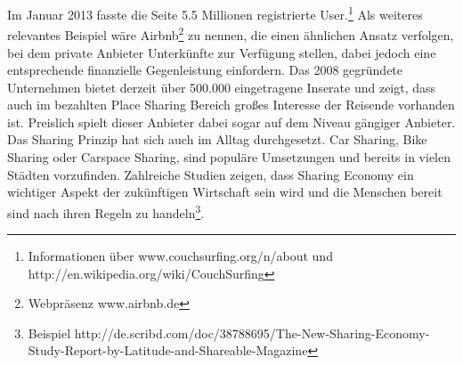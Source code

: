 Im Januar 2013 fasste die Seite 5.5 Millionen registrierte User.\footnote{Informationen über www.couchsurfing.org/n/about und http://en.wikipedia.org/wiki/CouchSurfing} Als weiteres relevantes Beispiel wäre Airbnb\footnote{Webpräsenz www.airbnb.de} zu nennen, die einen ähnlichen Ansatz verfolgen, bei dem private Anbieter Unterkünfte zur Verfügung stellen, dabei jedoch eine entsprechende finanzielle Gegenleistung einfordern.
Das 2008 gegründete Unternehmen bietet derzeit über 500.000 eingetragene Inserate und zeigt, dass auch im bezahlten Place Sharing Bereich großes Interesse der Reisende vorhanden ist. Preislich spielt dieser Anbieter dabei sogar auf dem Niveau gängiger Anbieter.\\

Das Sharing Prinzip hat sich auch im Alltag durchgesetzt.
Car Sharing, Bike Sharing oder Carspace Sharing, sind populäre Umsetzungen und bereits in vielen Städten vorzufinden. Zahlreiche Studien zeigen, dass Sharing Economy ein wichtiger Aspekt der zukünftigen Wirtschaft sein wird und die Menschen bereit sind nach ihren Regeln zu handeln\footnote{Beispiel http://de.scribd.com/doc/38788695/The-New-Sharing-Economy-Study-Report-by-Latitude-and-Shareable-Magazine}.\\


 





  

















